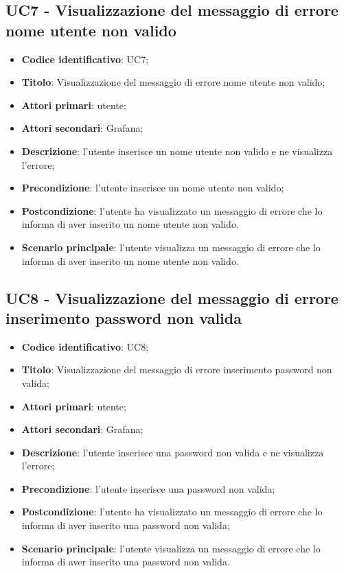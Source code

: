 \subsection{UC7 - Visualizzazione del messaggio di errore nome utente non valido}
\begin{itemize}
	\item \textbf{Codice identificativo}: UC7;
	\item \textbf{Titolo}: Visualizzazione del messaggio di errore nome utente non valido;
	\item \textbf{Attori primari}: utente;
	\item \textbf{Attori secondari}: Grafana\glo;
	\item \textbf{Descrizione}: l'utente inserisce un nome utente non valido e ne visualizza l'errore;
	\item \textbf{Precondizione}: l'utente inserisce un nome utente non valido;
	\item \textbf{Postcondizione}: l'utente ha visualizzato un messaggio di errore che lo informa di aver inserito un nome utente non valido.
	\item \textbf{Scenario principale}: l'utente visualizza un messaggio di errore che lo informa di aver inserito un nome utente non valido.
\end{itemize}
		
\subsection{UC8 - Visualizzazione del messaggio di errore inserimento password non valida}
\begin{itemize}
	\item \textbf{Codice identificativo}: UC8;
	\item \textbf{Titolo}: Visualizzazione del messaggio di errore inserimento password non valida;
	\item \textbf{Attori primari}: utente;
	\item \textbf{Attori secondari}: Grafana\glo;
	\item \textbf{Descrizione}: l'utente inserisce una password non valida e ne visualizza l'errore;	
	\item \textbf{Precondizione}: l'utente inserisce una password non valida;
	\item \textbf{Postcondizione}: l'utente ha visualizzato un messaggio di errore che lo informa di aver inserito una password non valida;
	\item \textbf{Scenario principale}: l'utente visualizza un messaggio di errore che lo informa di aver inserito una password non valida.
\end{itemize}
